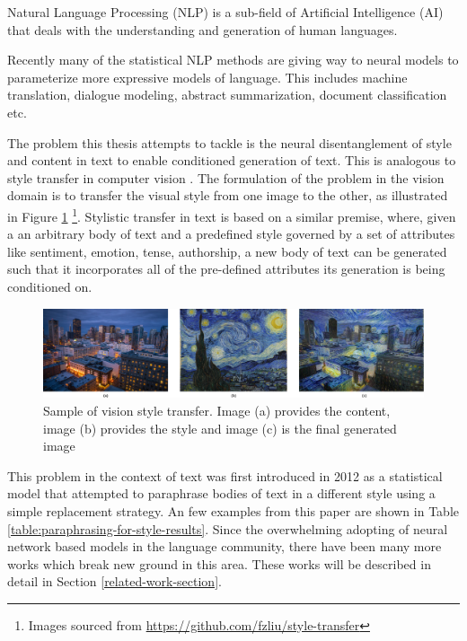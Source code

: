 Natural Language Processing (NLP) is a sub-field of Artificial Intelligence (AI) that deals with the understanding and generation of human languages.

Recently many of the statistical NLP methods are giving way to neural models to parameterize more expressive models of language. This includes machine translation, dialogue modeling, abstract summarization, document classification etc.

The problem this thesis attempts to tackle is the neural disentanglement of style and content in text to enable conditioned generation of text. This is analogous to style transfer in computer vision \citep{gatys2016image}. The formulation of the problem in the vision domain is to transfer the visual style from one image to the other, as illustrated in Figure \ref{fig:style-transfer-vision} \footnote{Images sourced from \url{https://github.com/fzliu/style-transfer}}. Stylistic transfer in text is based on a similar premise, where, given a an arbitrary body of text and a predefined style governed by a set of attributes like sentiment, emotion, tense, authorship, a new body of text can be generated such that it incorporates all of the pre-defined attributes its generation is being conditioned on.

\begin{figure}[ht]
	\centering
	\includegraphics[width=.8\textwidth]{images/style-transfer-vision.png}
	\caption{\label{fig:style-transfer-vision}Sample of vision style transfer. Image (a) provides the content, image (b) provides the style and image (c) is the final generated image}
\end{figure}

This problem in the context of text was first introduced in 2012 \citep{xu2012paraphrasing} as a statistical model that attempted to paraphrase bodies of text in a different style using a simple replacement strategy. An few examples from this paper are shown in Table \ref{table:paraphrasing-for-style-results}. Since the overwhelming adopting of neural network based models in the language community, there have been many more works which break new ground in this area. These works will be described in detail in Section \ref{related-work-section}.

